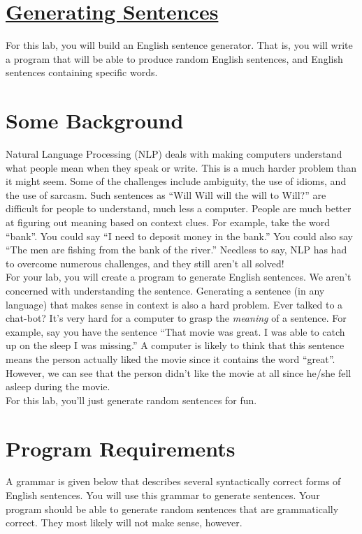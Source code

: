 \documentclass[11pt]{article}
\begin{document}
\section*{\underline{Generating Sentences}}
For this lab, you will build an English sentence generator.  That is,
you will write a program that will be able to produce random English
sentences, and English sentences containing specific words.

\section*{Some Background}
Natural Language Processing (NLP) deals with making computers
understand what people mean when they speak or write.  This is a much
harder problem than it might seem. Some of the challenges include
ambiguity, the use of idioms, and the use of sarcasm.  Such sentences
as ``Will Will will the will to Will?'' are difficult for people to
understand, much less a computer.  People are much better at figuring
out meaning based on context clues.  For example, take the word
``bank''.  You could say ``I need to deposit money in the bank.''  You
could also say ``The men are fishing from the bank of the river.''
Needless to say, NLP has had to overcome numerous challenges, and they
still aren't all solved!\\ 

For your lab, you will create a program to generate English sentences.
We aren't concerned with understanding the sentence.  Generating a
sentence (in any language) that makes sense in context is also a hard
problem.  Ever talked to a chat-bot?  It's very hard for a computer to
grasp the \textit{meaning} of a sentence.  For example, say you have
the sentence ``That movie was great.  I was able to catch up on the
sleep I was missing.''  A computer is likely to think that this
sentence means the person actually liked the movie since it contains
the word ``great''.  However, we can see that the person didn't like
the movie at all since he/she fell asleep during the movie.\\

For this lab, you'll just generate random sentences for fun.\\


\section*{Program Requirements}
A grammar is given below that describes several syntactically correct
forms of English sentences.  You will use this grammar to generate
sentences.  Your program should be able to generate random sentences that are grammatically
    correct. They most likely will not make sense, however.
\end{document}

